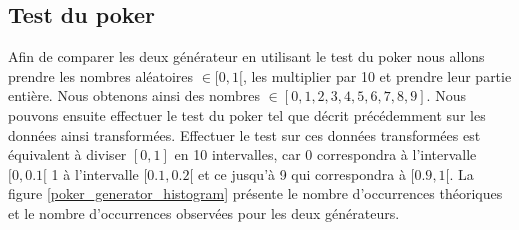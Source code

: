 \documentclass[10pt,a4paper]{article}
\begin{document}
\subsection{Test du poker}
Afin de comparer les deux générateur en utilisant le test du poker nous allons prendre les nombres aléatoires $\in [0,1[$, les multiplier par 10 et prendre leur partie entière. Nous obtenons ainsi des nombres $\in [0,1,2,3,4,5,6,7,8,9]$. Nous pouvons ensuite effectuer le test du poker tel que décrit précédemment sur les données ainsi transformées. Effectuer le test sur ces données transformées est équivalent à diviser $[0,1]$ en 10 intervalles, car 0 correspondra à l'intervalle $[0,0.1[$ 1 à l'intervalle $[0.1,0.2[$ et ce jusqu'à 9 qui correspondra à $[0.9,1[$.\newline \newline
La figure \ref{poker_generator_histogram} présente le nombre d'occurrences théoriques et le nombre d'occurrences observées pour les deux générateurs.
\end{document}
